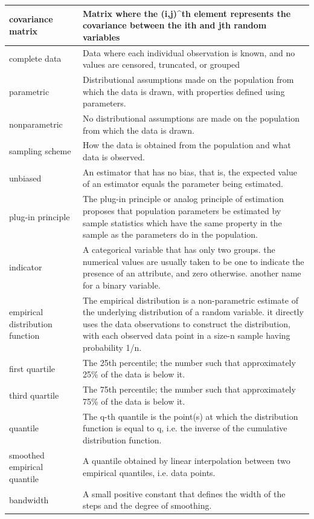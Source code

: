 \documentclass[
]{book}
\begin{document}
\begin{longtable}{>{\raggedright\arraybackslash}p{10em}|>{\raggedright\arraybackslash}p{30em}}
\hline
covariance matrix & Matrix where the (i,j)\textasciicircum{}th element represents the covariance between the ith and jth random variables\\
\hline
complete data & Data where each individual observation is known, and no values are censored, truncated, or grouped\\
\hline
parametric & Distributional assumptions made on the population from which the data is drawn, with properties defined using parameters.\\
\hline
nonparametric & No distributional assumptions are made on the population from which the data is drawn.\\
\hline
sampling scheme & How the data is obtained from the population and what data is observed.\\
\hline
unbiased & An estimator that has no bias, that is, the expected value of an estimator equals the parameter being estimated.\\
\hline
plug-in principle & The plug-in principle or analog principle of estimation proposes that population parameters be estimated by sample statistics which have the same property in the sample as the parameters do in the population.\\
\hline
indicator & A categorical variable that has only two groups. the numerical values are usually taken to be one to indicate the presence of an attribute, and zero otherwise. another name for a binary variable.\\
\hline
empirical distribution function & The empirical distribution is a non-parametric estimate of the underlying distribution of a random variable. it directly uses the data observations to construct the distribution, with each observed data point in a size-n sample having probability 1/n.\\
\hline
first quartile & The 25th percentile; the number such that approximately 25\% of the data is below it.\\
\hline
third quartile & The 75th percentile; the number such that approximately 75\% of the data is below it.\\
\hline
quantile & The q-th quantile is the point(s) at which the distribution function is equal to q, i.e. the inverse of the cumulative distribution function.\\
\hline
smoothed empirical quantile & A quantile obtained by linear interpolation between two empirical quantiles, i.e. data points.\\
\hline
bandwidth & A small positive constant that defines the width of the steps and the degree of smoothing.\\

\end{longtable}
\end{document}
